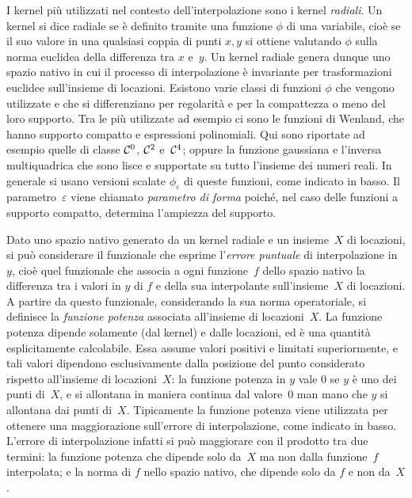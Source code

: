 I kernel più utilizzati nel contesto dell'interpolazione sono i kernel {\em radiali}.  Un kernel si dice radiale se è definito tramite una funzione $\phi$ di una variabile, cioè se il suo valore in una qualsiasi coppia di punti $x,y$ si ottiene valutando $\phi$ sulla norma euclidea della differenza tra $x$ e~$y$.  Un kernel radiale genera dunque uno spazio nativo in cui il processo di interpolazione è invariante per trasformazioni euclidee sull'insieme di locazioni.
Esistono varie classi di funzioni $\phi$ che vengono utilizzate e che si differenziano per regolarità e per la compattezza o meno del loro supporto.  Tra le più utilizzate ad esempio ci sono le funzioni di Wenland, che hanno supporto compatto e espressioni polinomiali.  Qui sono riportate ad esempio quelle di classe ${\cal C}^0$, ${\cal C}^2$ e~${\cal C}^4$; oppure la funzione gaussiana e l'inversa multiquadrica che sono lisce e supportate su tutto l'insieme dei numeri reali.
In generale si usano versioni scalate $\phi_\varepsilon$ di queste funzioni, come indicato in basso.  Il parametro~$\varepsilon$ viene chiamato {\em parametro di forma} poiché, nel caso delle funzioni a supporto compatto, determina l'ampiezza del supporto.  



Dato uno spazio nativo generato da un kernel radiale e un insieme~$X$ di locazioni, si può considerare il funzionale che esprime l'{\em errore puntuale} di interpolazione in~$y$, cioè quel funzionale che associa a ogni funzione~$f$ dello spazio nativo la differenza tra i valori in $y$ di $f$ e della sua interpolante sull'insieme~$X$ di locazioni.  A partire da questo funzionale, considerando la sua norma operatoriale, si definisce la {\em funzione potenza} associata all'insieme di locazioni~$X$.  La funzione potenza dipende solamente (dal kernel) e dalle locazioni, ed è una quantità esplicitamente calcolabile.  Essa assume valori positivi e limitati superiormente, e tali valori dipendono esclusivamente dalla posizione del punto considerato rispetto all'insieme di locazioni~$X$: la funzione potenza in $y$ vale $0$ se $y$ è uno dei punti di~$X$,  e si allontana in maniera continua dal valore~$0$ man mano che $y$ si allontana dai punti di~$X$.
Tipicamente la funzione potenza viene utilizzata per ottenere una maggiorazione sull'errore di interpolazione, come indicato in basso.  L'errore di interpolazione infatti si può maggiorare con il prodotto tra due termini: la funzione potenza che dipende solo da~$X$ ma non dalla funzione~$f$ interpolata; e la norma di $f$ nello spazio nativo, che dipende solo da $f$ e non da~$X$.


